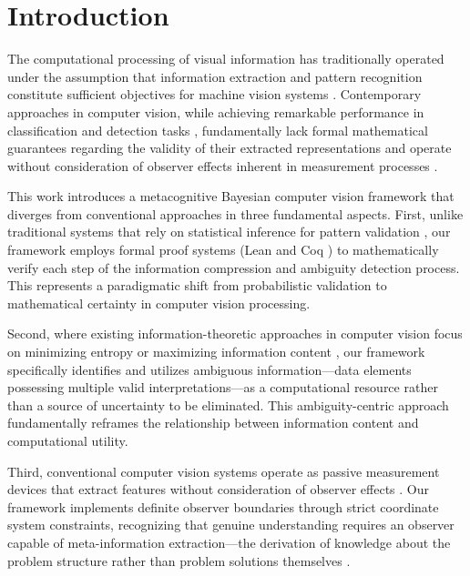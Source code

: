\section{Introduction}

The computational processing of visual information has traditionally operated under the assumption that information extraction and pattern recognition constitute sufficient objectives for machine vision systems \cite{szelisky2010computer, forsyth2011computer}. Contemporary approaches in computer vision, while achieving remarkable performance in classification and detection tasks \cite{krizhevsky2012imagenet, he2016deep}, fundamentally lack formal mathematical guarantees regarding the validity of their extracted representations and operate without consideration of observer effects inherent in measurement processes \cite{von2018mathematical}.

This work introduces a metacognitive Bayesian computer vision framework that diverges from conventional approaches in three fundamental aspects. First, unlike traditional systems that rely on statistical inference for pattern validation \cite{bishop2006pattern, murphy2012machine}, our framework employs formal proof systems (Lean \cite{moura2015lean} and Coq \cite{bertot2013interactive}) to mathematically verify each step of the information compression and ambiguity detection process. This represents a paradigmatic shift from probabilistic validation to mathematical certainty in computer vision processing.

Second, where existing information-theoretic approaches in computer vision focus on minimizing entropy or maximizing information content \cite{cover2006elements, mackay2003information}, our framework specifically identifies and utilizes ambiguous information—data elements possessing multiple valid interpretations—as a computational resource rather than a source of uncertainty to be eliminated. This ambiguity-centric approach fundamentally reframes the relationship between information content and computational utility.

Third, conventional computer vision systems operate as passive measurement devices that extract features without consideration of observer effects \cite{ballard1991animate, aloimonos1988active}. Our framework implements definite observer boundaries through strict coordinate system constraints, recognizing that genuine understanding requires an observer capable of meta-information extraction—the derivation of knowledge about the problem structure rather than problem solutions themselves \cite{hofstadter2007strange}.

